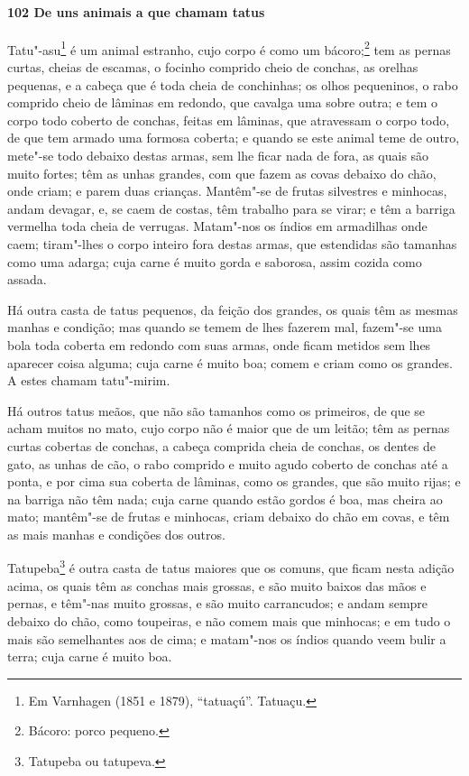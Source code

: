 \paragraph{102 De uns animais a que chamam tatus}

Tatu"-asu\footnote{ Em Varnhagen (1851 e 1879), ``tatuaçú''. Tatuaçu.} é um animal
estranho, cujo corpo é como um bácoro;\footnote{ Bácoro: porco pequeno.} tem as pernas
curtas, cheias de escamas, o focinho comprido cheio de conchas, as orelhas pequenas, e a
cabeça que é toda cheia de conchinhas; os olhos pequeninos, o rabo comprido cheio de
lâminas em redondo, que cavalga uma sobre outra; e tem o corpo todo coberto de conchas,
feitas em lâminas, que atravessam o corpo todo, de que tem armado uma formosa coberta; e
quando se este animal teme de outro, mete"-se todo debaixo destas armas, sem lhe ficar nada
de fora, as quais são muito fortes; têm as unhas grandes, com que fazem as covas debaixo
do chão, onde criam; e parem duas crianças. Mantêm"-se de frutas silvestres e minhocas,
andam devagar, e, se caem de costas, têm trabalho para se virar; e têm a barriga vermelha
toda cheia de verrugas. Matam"-nos os índios em armadilhas onde caem; tiram"-lhes o corpo
inteiro fora destas armas, que estendidas são tamanhas como uma adarga; cuja carne é muito
gorda e saborosa, assim cozida como assada.

Há outra casta de tatus pequenos, da feição dos grandes, os quais têm as mesmas manhas e
condição; mas quando se temem de lhes fazerem mal, fazem"-se uma bola toda coberta em
redondo com suas armas, onde ficam metidos sem lhes aparecer coisa alguma; cuja carne é
muito boa; comem e criam como os grandes. A estes chamam tatu"-mirim.

Há outros tatus meãos, que não são tamanhos como os primeiros, de que se acham muitos no
mato, cujo corpo não é maior que de um leitão; têm as pernas curtas cobertas de conchas, a
cabeça comprida cheia de conchas, os dentes de gato, as unhas de cão, o rabo comprido e
muito agudo coberto de conchas até a ponta, e por cima sua coberta de lâminas, como os
grandes, que são muito rijas; e na barriga não têm nada; cuja carne quando estão gordos é
boa, mas cheira ao mato; mantêm"-se de frutas e minhocas, criam debaixo do chão em covas, e
têm as mais manhas e condições dos outros.

Tatupeba\footnote{ Tatupeba ou tatupeva.} é outra casta de tatus maiores que os comuns,
que ficam nesta adição acima, os quais têm as conchas mais grossas, e são muito baixos das
mãos e pernas, e têm"-nas muito grossas, e são muito carrancudos; e andam sempre debaixo do
chão, como toupeiras, e não comem mais que minhocas; e em tudo o mais são semelhantes aos
de cima; e matam"-nos os índios quando veem bulir a terra; cuja carne é muito boa.

